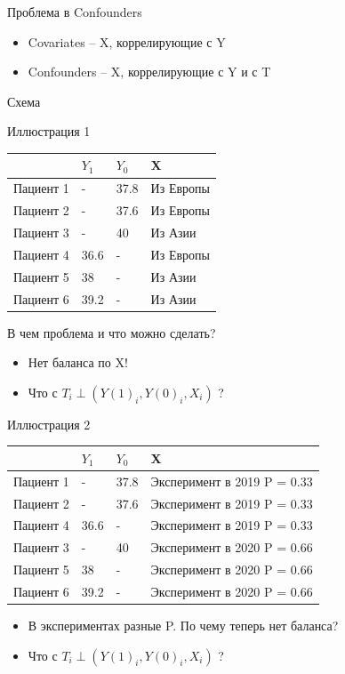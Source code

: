 \begin{frame}{Проблема в Confounders}
\begin{itemize}
   \item Covariates -- X, коррелирующие с Y
   \item Confounders -- X, коррелирующие с Y и с T
\end{itemize}

Схема

\end{frame} 


\begin{frame}{Иллюстрация 1}
\begin{table}[]
\begin{tabular}{l|l|l||l}
&$Y_1$ & $Y_0$ & X \\
\hline
Пациент 1 & - & 37.8 & Из Европы \\
Пациент 2 & - & 37.6 & Из Европы  \\
Пациент 3 & - & 40 & Из Азии  \\
Пациент 4 & 36.6 & - & Из Европы  \\
Пациент 5 &38   & - &  Из Азии \\
Пациент 6 &39.2 & - & Из Азии
\end{tabular}
\end{table}

В чем проблема и что можно сделать?
\begin{itemize}[<+->]
        \item Нет баланса по X!
        \item Что с $T_i \perp (Y(1)_i, Y(0)_i, X_i)$ ?
\end{itemize}
\end{frame} 


\begin{frame}{Иллюстрация 2}
\begin{table}[]
\begin{tabular}{l|l|l||l}
&$Y_1$ & $Y_0$ & X \\
\hline
Пациент 1 & - & 37.8 & Эксперимент в 2019 P = 0.33 \\
Пациент 2 & - & 37.6 & Эксперимент в 2019 P = 0.33 \\
Пациент 4 & 36.6 & - & Эксперимент в 2019 P = 0.33  \\
Пациент 3 & - & 40 & Эксперимент в 2020 P = 0.66 \\
Пациент 5 &38   & - &  Эксперимент в 2020 P = 0.66 \\
Пациент 6 &39.2 & - & Эксперимент в 2020 P = 0.66
\end{tabular}
\begin{itemize}
        \item В экспериментах разные P. По чему теперь нет баланса?
        \item Что с $T_i \perp (Y(1)_i, Y(0)_i, X_i)$ ?
\end{itemize}
\end{table}
\end{frame}

